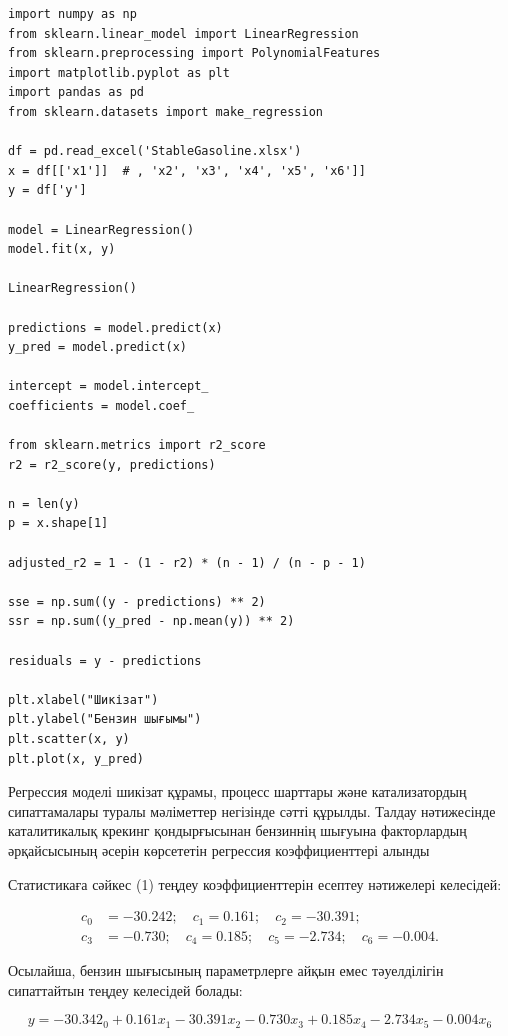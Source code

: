 \small{
\begin{lstlisting}
import numpy as np
from sklearn.linear_model import LinearRegression
from sklearn.preprocessing import PolynomialFeatures
import matplotlib.pyplot as plt
import pandas as pd
from sklearn.datasets import make_regression

df = pd.read_excel('StableGasoline.xlsx')
x = df[['x1']]  # , 'x2', 'x3', 'x4', 'x5', 'x6']]
y = df['y']

model = LinearRegression()
model.fit(x, y)

LinearRegression()

predictions = model.predict(x)
y_pred = model.predict(x)

intercept = model.intercept_
coefficients = model.coef_

from sklearn.metrics import r2_score
r2 = r2_score(y, predictions)

n = len(y)
p = x.shape[1]

adjusted_r2 = 1 - (1 - r2) * (n - 1) / (n - p - 1)

sse = np.sum((y - predictions) ** 2)
ssr = np.sum((y_pred - np.mean(y)) ** 2)

residuals = y - predictions

plt.xlabel("Шикізат")
plt.ylabel("Бензин шығымы")
plt.scatter(x, y)
plt.plot(x, y_pred)
\end{lstlisting}}

\begin{multicols}{2}
Регрессия моделі шикізат құрамы, процесс шарттары және катализатордың
сипаттамалары туралы мәліметтер негізінде сәтті құрылды. Талдау
нәтижесінде каталитикалық крекинг қондырғысынан бензиннің шығуына
факторлардың әрқайсысының әсерін көрсететін регрессия коэффициенттері
алынды

Статистикаға сәйкес (1) теңдеу коэффициенттерін есептеу нәтижелері
келесідей:
\end{multicols}

\begin{equation*}
\begin{aligned}
c_0 &= -30.242; \quad c_1 = 0.161; \quad c_2 = -30.391; \\
c_3 &= -0.730; \quad c_4 = 0.185; \quad c_5 = -2.734; \quad c_6 = -0.004.
\end{aligned}
\end{equation*}

Осылайша, бензин шығысының параметрлерге айқын емес тәуелділігін
сипаттайтын теңдеу келесідей болады:

\begin{equation}
y=-30.342_0+0.161x_1-30.391x_2-0.730x_3+0.185x_4-2.734x_5-0.004x_6
\end{equation}

